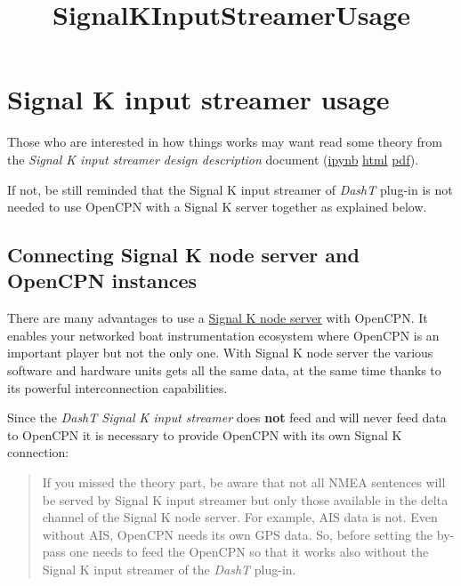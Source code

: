 \documentclass[11pt]{article}
\title{SignalKInputStreamerUsage}
\begin{document}
    
    \maketitle
    
    

    
    \hypertarget{signal-k-input-streamer-usage}{%
\section{Signal K input streamer
usage}\label{signal-k-input-streamer-usage}}

    Those who are interested in how things works may want read some theory
from the \emph{Signal K input streamer design description} document
(\href{SignalKInputStreamer.ipynb}{ipynb} \textbar{}
\href{SignalKInputStreamer.html}{html} \textbar{}
\href{SignalKInputStreamer.pdf}{pdf}).

    If not, be still reminded that the Signal K input streamer of
\emph{DashT} plug-in is not needed to use OpenCPN with a Signal K server
together as explained below.

    \hypertarget{connecting-signal-k-node-server-and-opencpn-instances}{%
\subsection{Connecting Signal K node server and OpenCPN
instances}\label{connecting-signal-k-node-server-and-opencpn-instances}}

    There are many advantages to use a
\href{https://github.com/SignalK/signalk-server-node/blob/master/README.md}{Signal
K node server} with OpenCPN. It enables your networked boat
instrumentation ecosystem where OpenCPN is an important player but not
the only one. With Signal K node server the various software and
hardware units gets all the same data, at the same time thanks to its
powerful interconnection capabilities.

    Since the \emph{DashT Signal K input streamer} does \textbf{not} feed
and will never feed data to OpenCPN it is necessary to provide OpenCPN
with its own Signal K connection:

    \begin{quote}
If you missed the theory part, be aware that not all NMEA sentences will
be served by Signal K input streamer but only those available in the
delta channel of the Signal K node server. For example, AIS data is not.
Even without AIS, OpenCPN needs its own GPS data. So, before setting the
by-pass one needs to feed the OpenCPN so that it works also without the
Signal K input streamer of the \emph{DashT} plug-in.
\end{quote}
\end{document}
